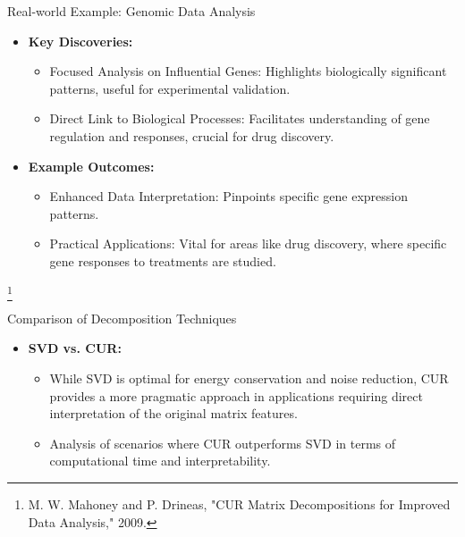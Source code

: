 \documentclass[pdf]{beamer}
\begin{document}
\begin{frame}{Real-world Example: Genomic Data Analysis}
    \begin{itemize}
        \item \textbf{Key Discoveries:}
        \begin{itemize}
            \item Focused Analysis on Influential Genes: Highlights biologically significant patterns, useful for experimental validation.
            \item Direct Link to Biological Processes: Facilitates understanding of gene regulation and responses, crucial for drug discovery.
        \end{itemize}
        \item \textbf{Example Outcomes:}
        \begin{itemize}
            \item Enhanced Data Interpretation: Pinpoints specific gene expression patterns.
            \item Practical Applications: Vital for areas like drug discovery, where specific gene responses to treatments are studied.
        \end{itemize}
    \end{itemize}
    \footnote{M. W. Mahoney and P. Drineas, "CUR Matrix Decompositions for Improved Data Analysis," 2009.}
\end{frame}


\begin{frame}{Comparison of Decomposition Techniques}
    \begin{itemize}
        \item \textbf{SVD vs. CUR:}
            \begin{itemize}
                \item While SVD is optimal for energy conservation and noise reduction, CUR provides a more pragmatic approach in applications requiring direct interpretation of the original matrix features.
                \item Analysis of scenarios where CUR outperforms SVD in terms of computational time and interpretability.
            \end{itemize}
    \end{itemize}
\end{frame}
\end{document}
